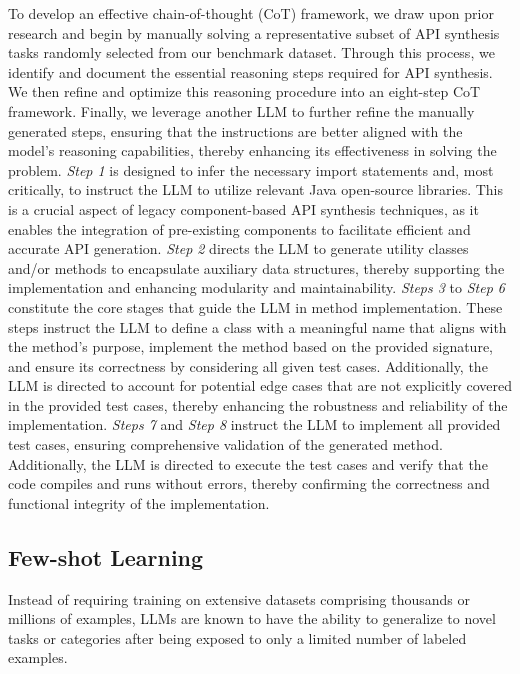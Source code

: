 To develop an effective chain-of-thought (CoT) framework, we draw upon prior research\cite{wei2022chain} and begin by manually solving a representative subset of API synthesis tasks randomly selected from our benchmark dataset. Through this process, we identify and document the essential reasoning steps required for API synthesis. We then refine and optimize this reasoning procedure into an eight-step CoT framework. Finally, we leverage another LLM to further refine the manually generated steps, ensuring that the instructions are better aligned with the model's reasoning capabilities, thereby enhancing its effectiveness in solving the problem. \textit{Step 1} is designed to infer the necessary import statements and, most critically, to instruct the LLM to utilize relevant Java open-source libraries. This is a crucial aspect of legacy component-based API synthesis techniques, as it enables the integration of pre-existing components to facilitate efficient and accurate API generation. \textit{Step 2} directs the LLM to generate utility classes and/or methods to encapsulate auxiliary data structures, thereby supporting the implementation and enhancing modularity and maintainability. \textit{Steps 3} to \textit{Step 6} constitute the core stages that guide the LLM in method implementation. These steps instruct the LLM to define a class with a meaningful name that aligns with the method’s purpose, implement the method based on the provided signature, and ensure its correctness by considering all given test cases. Additionally, the LLM is directed to account for potential edge cases that are not explicitly covered in the provided test cases, thereby enhancing the robustness and reliability of the implementation. \textit{Steps 7} and \textit{Step 8} instruct the LLM to implement all provided test cases, ensuring comprehensive validation of the generated method. Additionally, the LLM is directed to execute the test cases and verify that the code compiles and runs without errors, thereby confirming the correctness and functional integrity of the implementation.

\subsection{Few-shot Learning}
\label{sec:sec33}
Instead of requiring training on extensive datasets comprising thousands or millions of examples, LLMs are known to have the ability to generalize to novel tasks or categories after being exposed to only a limited number of labeled examples\cite{fewshotahmed2023}.

